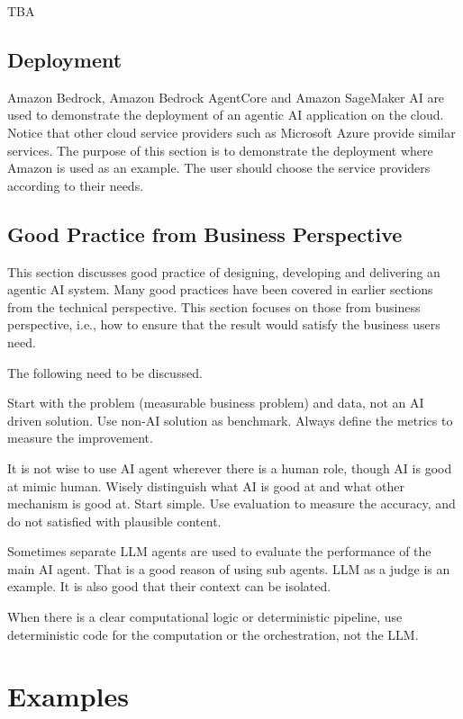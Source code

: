 TBA

\subsection{Deployment}

Amazon Bedrock, Amazon Bedrock AgentCore and Amazon SageMaker AI are used to demonstrate the deployment of an agentic AI application on the cloud. Notice that other cloud service providers such as Microsoft Azure provide similar services. The purpose of this section is to demonstrate the deployment where Amazon is used as an example. The user should choose the service providers according to their needs.



\subsection{Good Practice from Business Perspective}

This section discusses good practice of designing, developing and delivering an agentic AI system. Many good practices have been covered in earlier sections from the technical perspective. This section focuses on those from business perspective, i.e., how to ensure that the result would satisfy the business users need.

The following need to be discussed.

Start with the problem (measurable business problem) and data, not an AI driven solution. Use non-AI solution as benchmark. Always define the metrics to measure the improvement.

It is not wise to use AI agent wherever there is a human role, though AI is good at mimic human. Wisely distinguish what AI is good at and what other mechanism is good at. Start simple. Use evaluation to measure the accuracy, and do not satisfied with plausible content.

Sometimes separate LLM agents are used to evaluate the performance of the main AI agent. That is a good reason of using sub agents. LLM as a judge is an example. It is also good that their context can be isolated.

When there is a clear computational logic or deterministic pipeline, use deterministic code for the computation or the orchestration, not the LLM.

\section{Examples} \label{sec:agentic_ai_examples}

